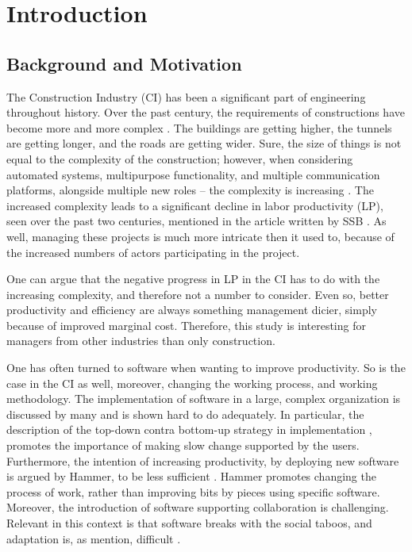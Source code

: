 \chapter{Introduction}

\section{Background and Motivation} \label{sec:background}
The Construction Industry (CI) has been a significant part of engineering throughout history. Over the past century, the requirements of constructions have become more and more complex \cite{wood2009factors}. The buildings are getting higher, the tunnels are getting longer, and the roads are getting wider. Sure, the size of things is not equal to the complexity of the construction; however, when considering automated systems, multipurpose functionality, and multiple communication platforms, alongside multiple new roles – the complexity is increasing \cite{arayici2010building}. The increased complexity leads to a significant decline in labor productivity (LP), seen over the past two centuries, mentioned in the article written by SSB \cite{productivity}. As well, managing these projects is much more intricate then it used to, because of the increased numbers of actors participating in the project. 
 
One can argue that the negative progress in LP in the CI has to do with the increasing complexity, and therefore not a number to consider. Even so, better productivity and efficiency are always something management dicier, simply because of improved marginal cost. Therefore, this study is interesting for managers from other industries than only construction.
 
One has often turned to software when wanting to improve productivity. So is the case in the CI as well, moreover, changing the working process, and working methodology. The implementation of software in a large, complex organization is discussed by many and is shown hard to do adequately. In particular, the description of the top-down contra bottom-up strategy in implementation \cite{Robey&Sahay}, promotes the importance of making slow change supported by the users. Furthermore, the intention of increasing productivity, by deploying new software is argued by Hammer, to be less sufficient \cite{hammer1990reengineering}. Hammer promotes changing the process of work, rather than improving bits by pieces using specific software. Moreover, the introduction of software supporting collaboration is challenging. Relevant in this context is that software breaks with the social taboos, and adaptation is, as mention, difficult \cite{Grudin}. 
 
